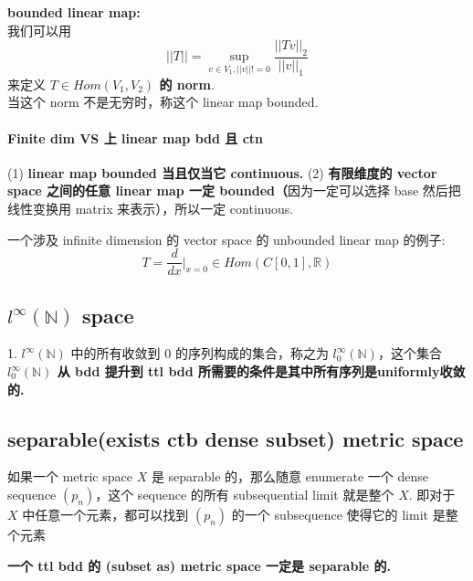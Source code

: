 \documentclass[lang=cn,11pt]{elegantbook}
\begin{document}
\begin{definition}
   \textbf{bounded linear map:} \\
   我们可以用 
   $$||T|| = \sup_{v \in V_1, ||v|| != 0} \frac{||Tv||_2}{||v||_1}$$
   来定义 \textbf{$T \in Hom(V_1, V_2)$ 的 norm}.
   \\当这个 norm 不是无穷时，称这个 linear map bounded.
\end{definition}
   
\paragraph{Finite dim VS 上 linear map bdd 且 ctn}
\begin{theorem}
    (1) \textbf{linear map bounded 当且仅当它 continuous.}
    (2)  \textbf{有限维度的 vector space 之间的任意 linear map 一定 bounded（}因为一定可以选择 base 然后把线性变换用 matrix 来表示），所以一定 continuous.
\end{theorem}

\begin{remark}
    一个涉及 infinite dimension 的 vector space 的 unbounded linear map 的例子: $$T = \frac{d}{dx}|_{x=0} \in Hom(C[0,1], \mathbb{R})$$
\end{remark}


\subsection{$l^{\infty}(\mathbb{N})$ space}

1. $l^{\infty}(\mathbb{N})$ 中的所有收敛到 0 的序列构成的集合，称之为 $l_0^{\infty}(\mathbb{N})$，这个集合 \textbf{$l_0^{\infty}(\mathbb{N})$ 从 bdd 提升到 ttl bdd 所需要的条件是其中所有序列是uniformly收敛的.}

\subsection{separable(exists ctb dense subset) metric space}

\begin{remark}
    如果一个 metric space $X$ 是 separable 的，那么随意 enumerate 一个 dense sequence $(p_n)$，这个 sequence 的所有 subsequential limit 就是整个 $X$. 即对于 $X$ 中任意一个元素，都可以找到 $(p_n)$ 的一个 subsequence 使得它的 limit 是整个元素
\end{remark}


\begin{theorem}
    \textbf{一个 ttl bdd 的 (subset as) metric space 一定是 separable 的.}
\end{theorem}
\end{document}
